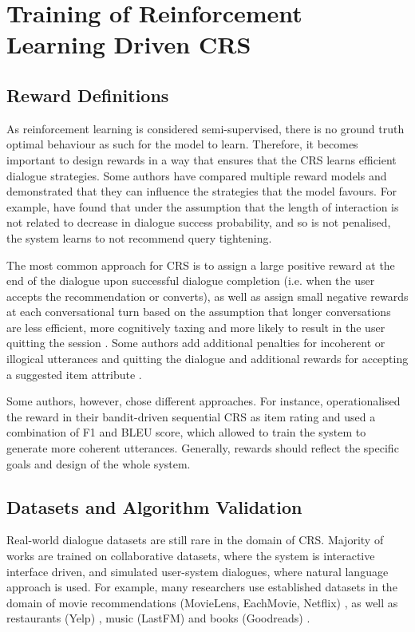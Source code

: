 \section{Training of Reinforcement Learning Driven CRS}
\subsection{Reward Definitions}
As reinforcement learning is considered semi-supervised, there is no ground truth optimal behaviour as such for the model to learn. Therefore, it becomes important to design rewards in a way that ensures that the CRS learns efficient dialogue strategies. Some authors have compared multiple reward models \citep{mahmood2007learning, sun2018conversational} and demonstrated that they can influence the strategies that the model favours. For example, \cite{mahmood2007learning} have found that under the assumption that the length of interaction is not related to decrease in dialogue success probability, and so is not penalised, the system learns to not recommend query tightening.

The most common approach for CRS is to assign a large positive reward at the end of the dialogue upon successful dialogue completion (i.e. when the user accepts the recommendation or converts), as well as assign small negative rewards at each conversational turn based on the assumption that longer conversations are less efficient, more cognitively taxing and more likely to result in the user quitting the session \citep{henderson2008hybrid, mahmood2007learning, sun2018conversational, tsumita2019dialogue, lei2020estimation}. Some authors add additional penalties for incoherent or illogical utterances \citep{tsumita2019dialogue} and quitting the dialogue \citep{lei2020estimation} and additional rewards for accepting a suggested item attribute \citep{lei2020estimation}.

Some authors, however, chose different approaches. For instance, \cite{zhao2013interactive} operationalised the reward in their bandit-driven sequential CRS as item rating and \cite{greco2017converse} used a combination of F1 and BLEU score, which allowed to train the system to generate more coherent utterances. Generally, rewards should reflect the specific goals and design of the whole system.

\subsection{Datasets and Algorithm Validation}
Real-world dialogue datasets are still rare in the domain of CRS. Majority of works are trained on collaborative datasets, where the system is interactive interface driven, and simulated user-system dialogues, where natural language approach is used. For example, many researchers use established datasets in the domain of movie recommendations (MovieLens, EachMovie, Netflix) \citep{zhao2013interactive, greco2017converse, vendrov2020gradient}, as well as restaurants (Yelp) \citep{sun2018conversational,  lei2020estimation}, music (LastFM) \citep{li2021seamlessly} and books (Goodreads) \citep{vendrov2020gradient}.

